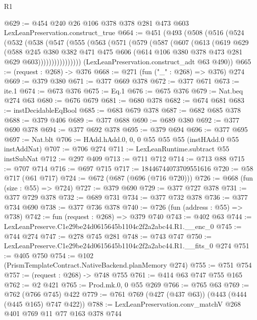 \begin{lexlean}{R1}
\begin{coremodule}
@629 := @454 @240 @26 @106 @378 @378 @281 @473 @603 LexLeanPreservation.construct_true
@664 := @451
    (@493
      (@508
        (@516
          (@524
            (@532
              (@538
                (@547
                  (@555
                    (@563
                      (@571
                        (@579
                          (@587
                            (@607
                              (@613
                                (@619
                                  @629
                                  (@588
                                    @245
                                    @380
                                    @382
                                    @471
                                    @475
                                    @606
                                    (@614 @106 @380 @378 @473 @281 @629 @603))))))))))))))))
      (LexLeanPreservation.construct_adt @63 @490))
@665 := (request : @268) -> @376
@668 := @271 (fun ("_" : @268) => @376) @274
@669 := @379 @380
@671 := @377 @669 @378
@672 := @377 @671
@673 := ite.{1}
@674 := @673 @376
@675 := Eq.{1}
@676 := @675 @376
@679 := Nat.beq @274 @63
@680 := @676 @679
@681 := @680 @378
@682 := @674 @681
@683 := instDecidableEqBool
@685 := @683 @679 @378
@687 := @682 @685 @378
@688 := @379 @406
@689 := @377 @688
@690 := @689 @380
@692 := @377 @690 @378
@694 := @377 @692 @378
@695 := @379 @694
@696 := @377 @695
@697 := Nat.blt
@706 := HAdd.hAdd.{0, 0, 0} @55 @55 @55 (instHAdd.{0} @55 instAddNat)
@707 := @706 @274
@711 := LexLeanRuntime.subtract @55 instSubNat
@712 := @297 @409
@713 := @711 @712
@714 := @713 @88
@715 := @707 @714
@716 := @697 @715
@717 := 18446744073709551616
@720 := @58 @717 (@61 @717)
@724 := @672 (@687 (@696 (@716 @720)))
@726 := @668 (fun (size : @55) => @724)
@727 := @379 @690
@729 := @377 @727 @378
@731 := @377 @729 @378
@732 := @689 @731
@734 := @377 @732 @378
@736 := @377 @734 @690
@738 := @377 @736 @378
@740 := @726 (fun (address : @55) => @738)
@742 := fun (request : @268) => @379 @740
@743 := @402 @63
@744 := LexLeanPreserve.C1e29be24d0615645b1104c2f2a2abc44.R1.__enc_0
@745 := @744 @274
@747 := @278 @745 @281
@748 := @743 @747
@750 := LexLeanPreserve.C1e29be24d0615645b1104c2f2a2abc44.R1.__fits_0 @274
@751 := @405 @750
@754 := @102 (PrismTemplateContract.NativeBackend.planMemory @274)
@755 := @751 @754
@757 := (request : @268) -> @748 @755
@761 := @414 @63 @747 @755 @165
@762 := @2 @421
@765 := Prod.mk.{0, 0} @55 @269
@766 := @765 @63
@769 := @762 (@766 @745) @422
@779 := @761 @769 (@427 (@437 @63)) (@443 (@444 (@445 @165) @747 @422))
@788 := LexLeanPreservation.conv_matchV @268 @401 @769 @11 @77 @163 @378 @744

\end{coremodule}
\end{lexlean}
